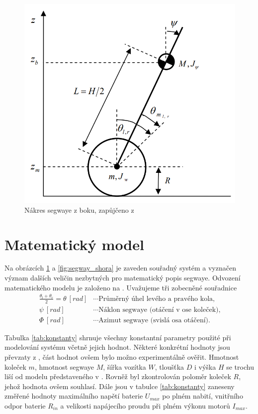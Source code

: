 \documentclass[conference]{IEEEtran}
\begin{document}
\begin{figure}[htbp]
    \centerline{\includegraphics[width=0.9\linewidth]{segway_bok.png}}
    \caption{Nákres segwaye z boku, zapůjčeno z \cite{model_based_design}}
    \label{fig:segway_bok}        
\end{figure}

\section{Matematický model}
Na obrázcích \ref{fig:segway_bok} a \ref{fig:segway_shora} je zaveden souřadný systém a vyznačen význam dalších veličin
nezbytných pro matematický popis segwaye. Odvození matematického modelu je založeno na \cite{model_based_design}.
Uvažujeme tři zobecněné souřadnice
\begin{equation*}
    \begin{aligned}
        \frac{\theta_l + \theta_r}{2} = \theta~ [\si{rad}] &\cdots \text{Průměrný úhel levého a pravého kola,} \\
        \psi ~[\si{rad}] &\cdots \text{Náklon segwaye (otáčení v ose koleček),} \\
        \varPhi~[\si{rad}] &\cdots \text{Azimut segwaye (svislá osa otáčení).}
    \end{aligned}
\end{equation*}



Tabulka \ref{tab:konstanty} shrnuje všechny konstantní parametry použité při modelování systému včetně jejich hodnot.
Některé konkrétní hodnoty jsou převzaty z \cite{model_based_design}, část hodnot ovšem bylo možno experimentálně ověřit.
Hmotnost koleček $m$, hmotnost segwaye $M$, šířka vozítka $W$, tloušťka $D$ i výška $H$ se trochu liší od modelu
představeného v \cite{model_based_design}. Rovněž byl zkontrolován poloměr koleček $R$, jehož hodnota ovšem souhlasí.
Dále jsou v tabulce \ref{tab:konstanty} zaneseny změřené hodnoty maximálního napětí baterie $U_{max}$ po plném nabití,
vnitřního odpor baterie $R_{in}$ a velikosti napájecího proudu při plném výkonu motorů $I_{max}$. 
\end{document}
